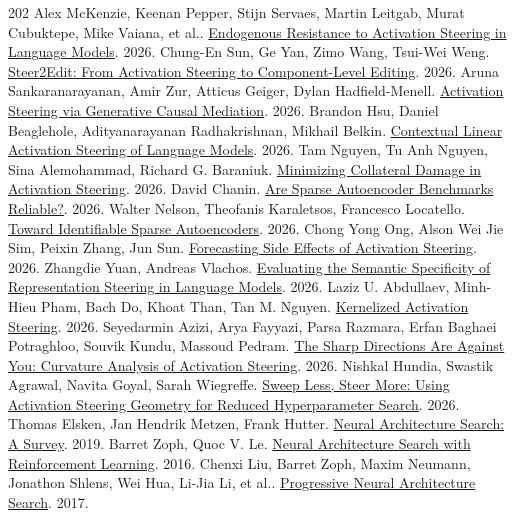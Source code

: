 \begin{thebibliography}{202}
 Alex McKenzie, Keenan Pepper, Stijn Servaes, Martin Leitgab, Murat Cubuktepe, Mike Vaiana, et al.. \href{https://arxiv.org/abs/2602.06941v3}{Endogenous Resistance to Activation Steering in Language Models}. 2026.
 Chung-En Sun, Ge Yan, Zimo Wang, Tsui-Wei Weng. \href{https://arxiv.org/abs/2602.09870v3}{Steer2Edit: From Activation Steering to Component-Level Editing}. 2026.
 Aruna Sankaranarayanan, Amir Zur, Atticus Geiger, Dylan Hadfield-Menell. \href{https://arxiv.org/abs/2602.16080v2}{Activation Steering via Generative Causal Mediation}. 2026.
 Brandon Hsu, Daniel Beaglehole, Adityanarayanan Radhakrishnan, Mikhail Belkin. \href{https://arxiv.org/abs/2604.24693v2}{Contextual Linear Activation Steering of Language Models}. 2026.
 Tam Nguyen, Tu Anh Nguyen, Sina Alemohammad, Richard G. Baraniuk. \href{https://arxiv.org/abs/2605.01167v1}{Minimizing Collateral Damage in Activation Steering}. 2026.
 David Chanin. \href{https://arxiv.org/abs/2605.18229v1}{Are Sparse Autoencoder Benchmarks Reliable?}. 2026.
 Walter Nelson, Theofanis Karaletsos, Francesco Locatello. \href{https://arxiv.org/abs/2605.31245v2}{Toward Identifiable Sparse Autoencoders}. 2026.
 Chong Yong Ong, Alson Wei Jie Sim, Peixin Zhang, Jun Sun. \href{https://arxiv.org/abs/2608.11227v1}{Forecasting Side Effects of Activation Steering}. 2026.
 Zhangdie Yuan, Andreas Vlachos. \href{https://arxiv.org/abs/2608.29431v1}{Evaluating the Semantic Specificity of Representation Steering in Language Models}. 2026.
 Laziz U. Abdullaev, Minh-Hieu Pham, Bach Do, Khoat Than, Tan M. Nguyen. \href{https://arxiv.org/abs/2610.01062v2}{Kernelized Activation Steering}. 2026.
 Seyedarmin Azizi, Arya Fayyazi, Parsa Razmara, Erfan Baghaei Potraghloo, Souvik Kundu, Massoud Pedram. \href{https://arxiv.org/abs/2610.16084v1}{The Sharp Directions Are Against You: Curvature Analysis of Activation Steering}. 2026.
 Nishkal Hundia, Swastik Agrawal, Navita Goyal, Sarah Wiegreffe. \href{https://arxiv.org/abs/2611.01496v1}{Sweep Less, Steer More: Using Activation Steering Geometry for Reduced Hyperparameter Search}. 2026.
 Thomas Elsken, Jan Hendrik Metzen, Frank Hutter. \href{https://jmlr.org/papers/v20/18-598.html}{Neural Architecture Search: A Survey}. 2019.
 Barret Zoph, Quoc V. Le. \href{https://arxiv.org/abs/1611.01578}{Neural Architecture Search with Reinforcement Learning}. 2016.
 Chenxi Liu, Barret Zoph, Maxim Neumann, Jonathon Shlens, Wei Hua, Li-Jia Li, et al.. \href{https://arxiv.org/abs/1712.00559v3}{Progressive Neural Architecture Search}. 2017.

\end{thebibliography}
